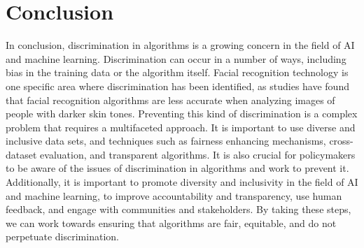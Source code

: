 \documentclass[
	12pt,
    a4paper,
    egregdoesnotlikesansseriftitles, %
    toc=chapterentrywithdots,
    oneside, openany,
    titlepage,
    parskip=half,
    headings=normal,  %
    listof=totoc,
    bibliography=totocnumbered,
    index=totoc,
    captions=tableheading,  %
    listof=flat,
    numbers=noenddot, %
    final]
    {scrbook}
\begin{document}
\chapter{Conclusion}
In conclusion, discrimination in algorithms is a growing concern in the field of AI and machine learning.
Discrimination can occur in a number of ways, including bias in the training data or the algorithm itself.
Facial recognition technology is one specific area where discrimination has been identified, as studies have found that facial recognition algorithms are less accurate when analyzing images of people with darker skin tones.
Preventing this kind of discrimination is a complex problem that requires a multifaceted approach.
It is important to use diverse and inclusive data sets, and techniques such as fairness enhancing mechanisms, cross-dataset evaluation, and transparent algorithms. 
It is also crucial for policymakers to be aware of the issues of discrimination in algorithms and work to prevent it.
Additionally, it is important to promote diversity and inclusivity in the field of AI and machine learning, to improve accountability and transparency, use human feedback, and engage with communities and stakeholders.
By taking these steps, we can work towards ensuring that algorithms are fair, equitable, and do not perpetuate discrimination.







\backmatter


%
%
%
\printbibliography

\clearpage %




\end{document}
